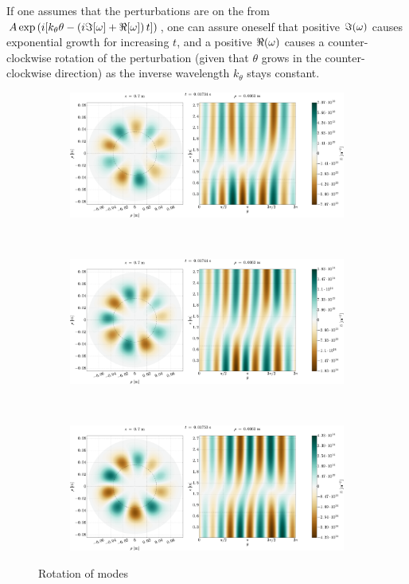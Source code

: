 If one assumes that the perturbations are on the from $A\exp\left(i[k_\theta \theta - \left(i\Im[\omega] + \Re[\omega]\right) t]\right)$, one can assure oneself that positive $\Im(\omega)$ causes exponential growth for increasing $t$, and a positive $\Re(\omega)$ causes a counter-clockwise rotation of the perturbation (given that $\theta$ grows in the counter-clockwise direction) as the inverse wavelength $k_\theta$ stays constant.
%
%
\begin{figure}[htbp]
    \centering
    \begin{subfigure}[h]{1.00\textwidth}
        \centering
        \includegraphics[width=1.0\textwidth]{fig/results/rotModes/n-perpPol-2D-fluct-0}
        \label{fig:rot1}
    \end{subfigure}%
    \\
    \begin{subfigure}[h]{1.00\textwidth}
        \centering
        \includegraphics[width=1.0\textwidth]{fig/results/rotModes/n-perpPol-2D-fluct-1}
        \label{fig:rot2}
    \end{subfigure}
    \\
    \begin{subfigure}[h]{1.00\textwidth}
        \centering
        \includegraphics[width=1.0\textwidth]{fig/results/rotModes/n-perpPol-2D-fluct-2}
        \label{fig:rot3}
    \end{subfigure}
    \caption{Rotation of modes}
    \label{fig:modeRotation}
\end{figure}

